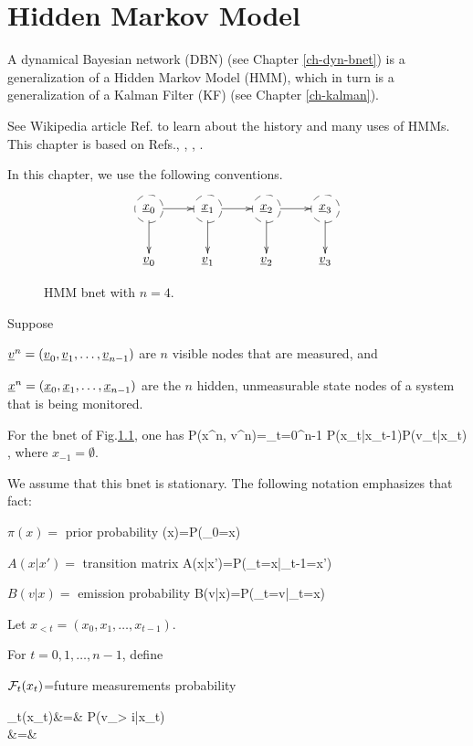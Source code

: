 \chapter{Hidden Markov Model}
\label{ch-hmm}

A dynamical Bayesian
network (DBN)  (see Chapter
\ref{ch-dyn-bnet})
is a generalization
of a
Hidden Markov Model (HMM), which
in turn is 
 a  generalization of a
Kalman Filter (KF) (see Chapter
\ref{ch-kalman}).

See Wikipedia article 
Ref.\cite{wiki-hmm} to learn 
about the history 
and many uses of HMMs. This
chapter is based on
Refs.\cite{nuel}, \cite{wiki-hmm},
\cite{wiki-viterbi}, \cite{wiki-baum}.

In this
chapter,
we use the following conventions.

\bnetConventions


\begin{figure}[h!]
\centering
$$\xymatrix{
*++[F-o]{\rvx_0}\ar[d]\ar[r]&
*++[F-o]{\rvx_1}\ar[d]\ar[r]&
*++[F-o]{\rvx_2}\ar[d]\ar[r]&
*++[F-o]{\rvx_3}\ar[d]\\
\rvv_0&
\rvv_1&
\rvv_2&
\rvv_3
}$$
\caption{HMM bnet
with $n=4$.}
\label{fig-hmm}
\end{figure}

Suppose 

${\underline{v}}^n=({\underline{v}}_0, {\underline{v}}_1, 
\ldots, {\underline{v}}_{n-1})$
are $n$ visible nodes that
are measured,
and 

${\underline{x}}^n=({\underline{x}}_0, {\underline{x}}_1, 
\ldots, {\underline{x}}_{n-1})$
are the $n$ hidden, unmeasurable 
state nodes of a system
that is being monitored.



For the bnet of Fig.\ref{fig-hmm},
one has
\beq
P(x^n, v^n)=\prod_{t=0}^{n-1}
P(x_t|x_{t-1})P(v_t|x_t)
\;,
\eeq
where $x_{-1}=\emptyset$.

We assume that this bnet is stationary.
The following notation
emphasizes that fact:

$\pi(x)=$ prior probability
\beq
\pi(x)=P(\rvx_0=x)
\eeq

$A(x|x')=$ transition matrix
\beq
A(x|x')=P(\rvx_t=x|\rvx_{t-1}=x')
\eeq

$B(v|x)=$ emission probability
\beq
B(v|x)=P(\rvv_t=v|\rvx_t=x)
\eeq


Let
$x_{<t} =(x_0, x_1, \dots, x_{t-1})$.

For $t=0,1, \dots, n-1$, define

${\cal F}_t(x_t)$=future measurements probability

\beqa
\calf_t(x_t)&=&
P(v_{> i}|x_t)
\\
&=&
\eeqa

